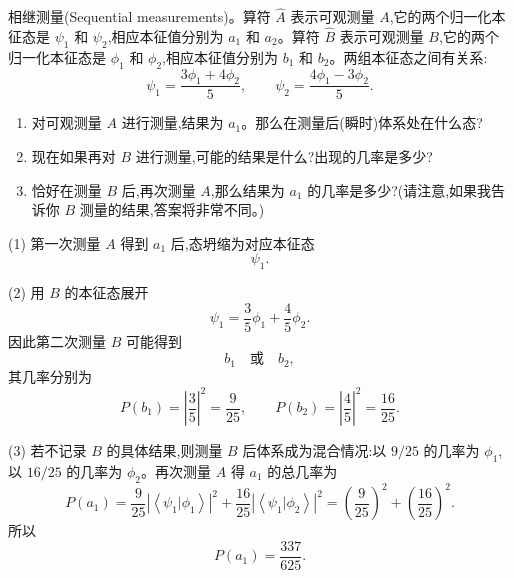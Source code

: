 \begin{question}
相继测量(Sequential measurements)。算符 $\hat A$ 表示可观测量 $A$,它的两个归一化本征态是 $\psi_1$ 和 $\psi_2$,相应本征值分别为 $a_1$ 和 $a_2$。算符 $\hat B$ 表示可观测量 $B$,它的两个归一化本征态是 $\phi_1$ 和 $\phi_2$,相应本征值分别为 $b_1$ 和 $b_2$。两组本征态之间有关系:
\[
\psi_1=\frac{3\phi_1+4\phi_2}{5},
\qquad
\psi_2=\frac{4\phi_1-3\phi_2}{5}.
\]
\begin{enumerate}
\item 对可观测量 $A$ 进行测量,结果为 $a_1$。那么在测量后(瞬时)体系处在什么态?
\item 现在如果再对 $B$ 进行测量,可能的结果是什么?出现的几率是多少?
\item 恰好在测量 $B$ 后,再次测量 $A$,那么结果为 $a_1$ 的几率是多少?(请注意,如果我告诉你 $B$ 测量的结果,答案将非常不同。)
\end{enumerate}
\begin{solution}
(1) 第一次测量 $A$ 得到 $a_1$ 后,态坍缩为对应本征态
\[
\boxed{\psi_1.}
\]

(2) 用 $B$ 的本征态展开
\[
\psi_1=\frac{3}{5}\phi_1+\frac{4}{5}\phi_2.
\]
因此第二次测量 $B$ 可能得到
\[
b_1\quad\text{或}\quad b_2,
\]
其几率分别为
\[
P(b_1)=\left|\frac35\right|^2=\frac9{25},
\qquad
P(b_2)=\left|\frac45\right|^2=\frac{16}{25}.
\]

(3) 若不记录 $B$ 的具体结果,则测量 $B$ 后体系成为混合情况:以 $9/25$ 的几率为 $\phi_1$,以 $16/25$ 的几率为 $\phi_2$。再次测量 $A$ 得 $a_1$ 的总几率为
\[
P(a_1)=\frac9{25}|\left\langle \psi_1|\phi_1 \right\rangle|^2
+\frac{16}{25}|\left\langle \psi_1|\phi_2 \right\rangle|^2
=\left(\frac9{25}\right)^2+\left(\frac{16}{25}\right)^2.
\]
所以
\[
\boxed{P(a_1)=\frac{337}{625}.}
\]
\end{solution}
\end{question}

